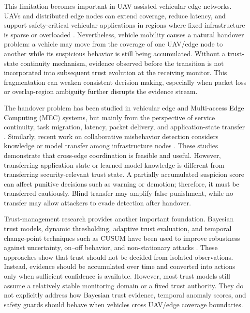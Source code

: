 \documentclass[journal]{IEEEtran}
\begin{document}
This limitation becomes important in UAV-assisted vehicular edge networks. UAVs and distributed edge nodes can extend coverage, reduce latency, and support safety-critical vehicular applications in regions where fixed infrastructure is sparse or overloaded \cite{vehFogSurvey2023,hao2024UAVVehicularFRL}. Nevertheless, vehicle mobility causes a natural handover problem: a vehicle may move from the coverage of one UAV/edge node to another while its suspicious behavior is still being accumulated. Without a trust-state continuity mechanism, evidence observed before the transition is not incorporated into subsequent trust evolution at the receiving monitor. This fragmentation can weaken consistent decision making, especially when packet loss or overlap-region ambiguity further disrupts the evidence stream.

The handover problem has been studied in vehicular edge and Multi-access
Edge Computing (MEC) systems, but mainly from the perspective of service continuity, task migration, latency, packet delivery, and application-state transfer \cite{qi2021SocialHandover,monir2022SeamlessHandover,ali2024EdgeFogFederation}. Similarly, recent work on collaborative misbehavior detection considers knowledge or model transfer among infrastructure nodes \cite{sedar2024KnowledgeTransfer}. These studies demonstrate that cross-edge coordination is feasible and useful. However, transferring application state or learned model knowledge is different from transferring security-relevant trust state. A partially accumulated suspicion score can affect punitive decisions such as warning or demotion; therefore, it must be transferred cautiously. Blind transfer may amplify false punishment, while no transfer may allow attackers to evade detection after handover.

Trust-management research provides another important foundation. Bayesian trust models, dynamic thresholding, adaptive trust evaluation, and temporal change-point techniques such as CUSUM have been used to improve robustness against uncertainty, on--off behavior, and non-stationary attacks \cite{siddiqui2021SurveyTrustIoV,abidi2025CAMSI,comert2021change,liu2025QART}. These approaches show that trust should not be decided from isolated observations. Instead, evidence should be accumulated over time and converted into actions only when sufficient confidence is available. However, most trust models still assume a relatively stable monitoring domain or a fixed trust authority. They do not explicitly address how Bayesian trust evidence, temporal anomaly scores, and safety guards should behave when vehicles cross UAV/edge coverage boundaries.
\end{document}
